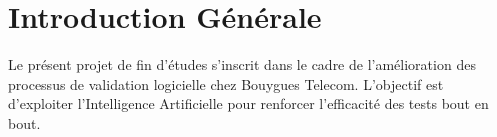 \chapter{Introduction Générale}

Le présent projet de fin d'études s'inscrit dans le cadre de l'amélioration des processus de validation logicielle chez Bouygues Telecom. L'objectif est d'exploiter l'Intelligence Artificielle pour renforcer l'efficacité des tests bout en bout.

\newpage
